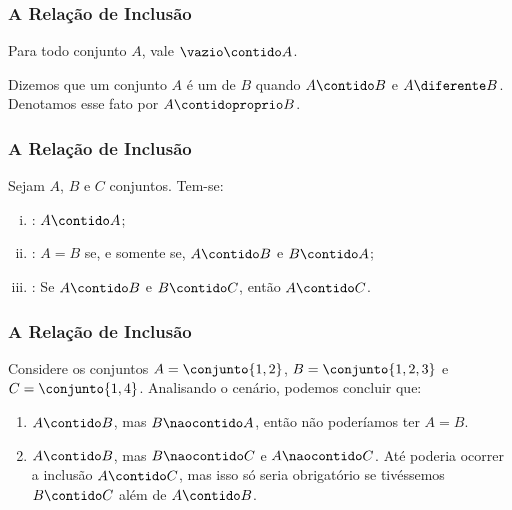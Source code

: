 \begin{frame}
	\frametitle{A Relação de Inclusão} 

	\begin{proposicao}
		Para todo conjunto $A$, vale $\vazio \contido A$.
	\end{proposicao}\pause

	\begin{definicao}
		Dizemos que um conjunto $A$ é um  de $B$ quando $A \contido B$  e $A \diferente B$. Denotamos esse fato por $A \contidoproprio B$.
	\end{definicao}
\end{frame}


\begin{frame}
	\frametitle{A Relação de Inclusão} 

	\begin{proposicao}
		Sejam $A$, $B$ e $C$ conjuntos. Tem-se:
		\begin{enumerate}[i.]
			\item {}: $A \contido A$;
			\item {}: $A = B$ se, e somente se, $A \contido B$ e $B \contido A$;
			\item {}: Se $A \contido B$ e $B \contido C$, então $A \contido C$.
		\end{enumerate}
	\end{proposicao}

\end{frame}


\begin{frame}
	\frametitle{A Relação de Inclusão} 

	\begin{exemplo}
		Considere os conjuntos $A = \conjunto{1, 2}$, $B = \conjunto{1, 2, 3}$ e $C = \conjunto{1,  4}$. Analisando o cenário, podemos concluir que:
	\begin{enumerate}
		\item $A \contido B$, mas $B \naocontido A$, então não poderíamos ter $A = B$.
		\item $A \contido B$, mas $B \naocontido C$ e $A \naocontido C$. Até poderia ocorrer a inclusão $A \contido C$, mas isso só seria obrigatório se tivéssemos $B \contido C$ além de $A \contido B$.
	\end{enumerate}
	\end{exemplo}

\end{frame}



